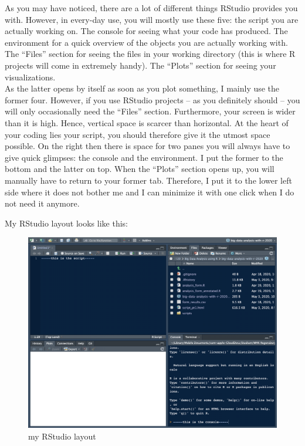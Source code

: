 \documentclass[
]{book}
\begin{document}
As you may have noticed, there are a lot of different things RStudio provides you with. However, in every-day use, you will mostly use these five: the script you are actually working on. The console for seeing what your code has produced. The environment for a quick overview of the objects you are actually working with. The ``Files'' section for seeing the files in your working directory (this is where R projects will come in extremely handy). The ``Plots'' section for seeing your visualizations.\\
As the latter opens by itself as soon as you plot something, I mainly use the former four. However, if you use RStudio projects -- as you definitely should -- you will only occasionally need the ``Files'' section. Furthermore, your screen is wider than it is high. Hence, vertical space is scarcer than horizontal. At the heart of your coding lies your script, you should therefore give it the utmost space possible. On the right then there is space for two panes you will always have to give quick glimpses: the console and the environment. I put the former to the bottom and the latter on top. When the ``Plots'' section opens up, you will manually have to return to your former tab. Therefore, I put it to the lower left side where it does not bother me and I can minimize it with one click when I do not need it anymore.

My RStudio layout looks like this:

\begin{figure}
\centering
\includegraphics{figures/rstudio-layout.png}
\caption{my RStudio layout}
\end{figure}
\end{document}
